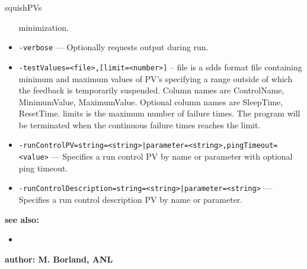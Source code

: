 \begin{sddsprog}{squishPVs}
\begin{itemize}
                minimization.
        \item {\tt -verbose} --- Optionally requests output during run.
        \item {\tt -testValues=<file>,[limit=<number>]} --
                     file is a sdds format file containing minimum and maximum values
                     of PV's specifying a range outside of which the feedback
                     is temporarily suspended. Column names are ControlName,
                     MinimumValue, MaximumValue. Optional column names are
                     SleepTime, ResetTime.
                     limits is the maximum number of failure times. The program will be
                     terminated when the continuous failure times reaches the limit.
        \item {\tt -runControlPV={string=<string>|parameter=<string>},pingTimeout=<value>} ---
                    Specifies a run control PV by name or parameter with optional ping timeout.
        \item {\tt -runControlDescription={string=<string>|parameter=<string>}} ---
                    Specifies a run control description PV by name or parameter.
    \end{itemize}

\item {\bf see also:}
    \begin{itemize}
    \item {}
    \end{itemize}
\item {\bf author: M. Borland, ANL} 
\end{sddsprog}
